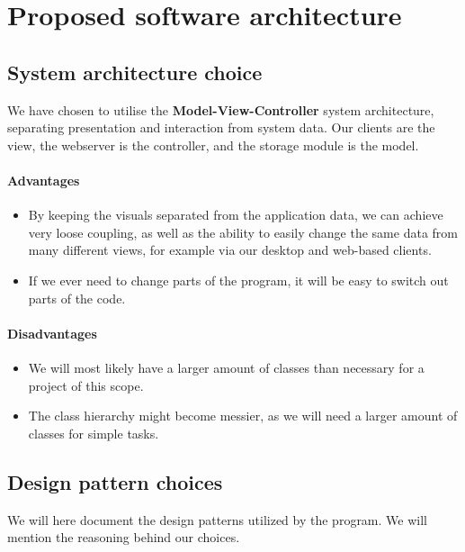 \chapter{Proposed software architecture}
\label{sec:Proposed software architecture}






\section{System architecture choice}
We have chosen to utilise the \textbf{Model-View-Controller} system architecture, separating presentation and interaction from system data. Our clients are the view, the webserver is the controller, and the storage module is the model.

\subsubsection{Advantages}
\begin{itemize}
	\item By keeping the visuals separated from the application data, we can achieve very loose coupling, as well as the ability to easily change the same data from many different views, for example via our desktop and web-based clients. \\
	\item If we ever need to change parts of the program, it will be easy to switch out parts of the code.
\end{itemize}


\subsubsection{Disadvantages}
\begin{itemize}
	\item We will most likely have a larger amount of classes than necessary for a project of this scope. \\
	\item The class hierarchy might become messier, as we will need a larger amount of classes for simple tasks.
\end{itemize}

\section{Design pattern choices}
We will here document the design patterns utilized by the program. We will mention the reasoning behind our choices.

